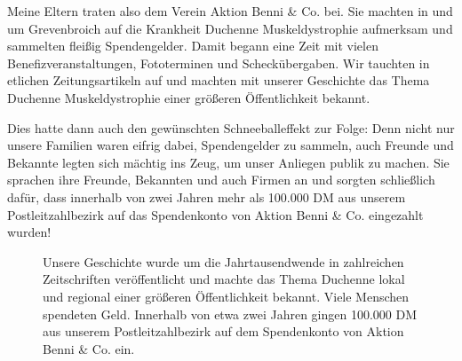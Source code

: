 \documentclass[fontsize=14pt,a4paper,headinclude,DIV=calc,automark]{scrbook}
\begin{document}
Meine Eltern traten also dem Verein Aktion Benni \& Co. bei. Sie machten in und um Grevenbroich auf die Krankheit Duchenne Muskeldystrophie aufmerksam und sammelten fleißig Spendengelder. Damit begann eine Zeit mit vielen Benefizveranstaltungen, Fototerminen und Scheckübergaben. Wir tauchten in etlichen Zeitungsartikeln auf und machten mit unserer Geschichte das Thema Duchenne Muskeldystrophie einer größeren Öffentlichkeit bekannt.

Dies hatte dann auch den gewünschten Schneeballeffekt zur Folge: Denn nicht nur unsere Familien waren eifrig dabei, Spendengelder zu sammeln, auch Freunde und Bekannte legten sich mächtig ins Zeug, um unser Anliegen publik zu machen. Sie sprachen ihre Freunde, Bekannten und auch Firmen an und sorgten schließlich dafür, dass innerhalb von zwei Jahren mehr als 100.000 DM aus unserem Postleitzahlbezirk auf das Spendenkonto von Aktion Benni \& Co. eingezahlt wurden!

\setlength{\fboxsep}{0pt}    %
\setlength{\fboxrule}{0.2pt} %
\begin{figure}[ht]
    \centering
    \caption{Unsere Geschichte wurde um die Jahrtausendwende in zahlreichen Zeitschriften veröffentlicht und machte das Thema Duchenne lokal und regional einer größeren Öffentlichkeit bekannt. Viele Menschen spendeten Geld. Innerhalb von etwa zwei Jahren gingen 100.000 DM aus unserem Postleitzahlbezirk auf dem Spendenkonto von Aktion Benni \& Co. ein.}
    \label{fig:zeitungsausschnitte}
\end{figure}
\end{document}
